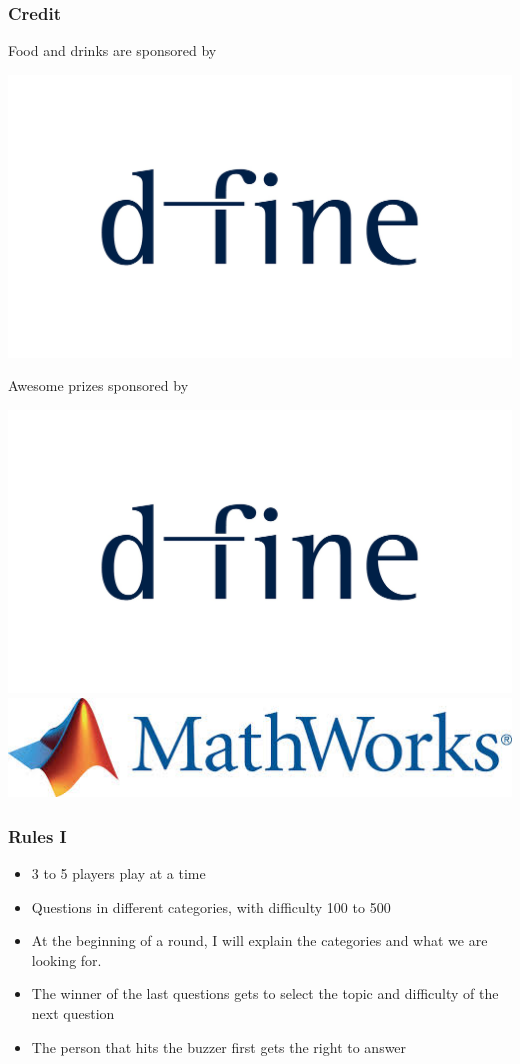 \documentclass{beamer}
\begin{document}
	\begin{frame}
		\frametitle{Credit}
		Food and drinks are sponsored by 
			\begin{center}
				{\includegraphics[scale = 0.3]{../orga/d-fine_cmyk_100_75_10_60_pz.jpg}}
			\end{center}
		Awesome prizes sponsored by 
		\begin{center}
			{\includegraphics[scale = 0.3]{../orga/d-fine_cmyk_100_75_10_60_pz.jpg}} 
			\newline
			{\includegraphics[scale = 0.3]{mathworks.jpg}}
		\end{center}
	\end{frame}
		
	\begin{frame}
		\frametitle{Rules I}
		\begin{itemize}
			\item 3 to 5 players play at a time
			\item Questions in different categories, with difficulty 100 to 500 
			\item At the beginning of a round, I will explain the categories and what we are looking for.
			\item The winner of the last questions gets to select the topic and difficulty of the next question
			\item The person that hits the buzzer first gets the right to answer
		\end{itemize}
	\end{frame}
	
\end{document}
